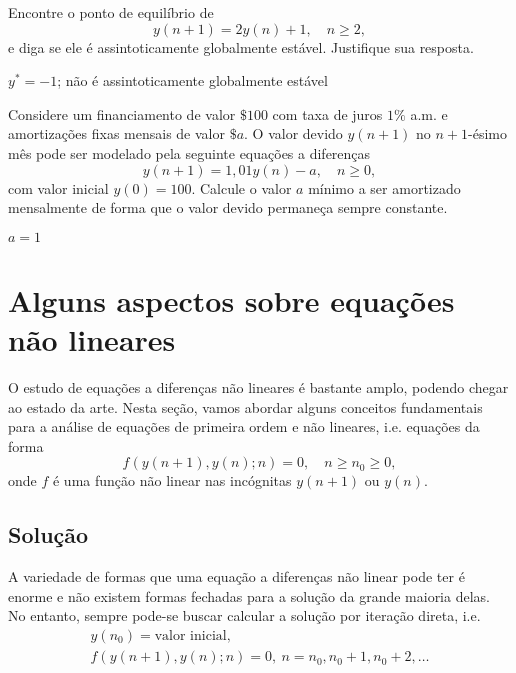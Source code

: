 \begin{exer}
  Encontre o ponto de equilíbrio de
  \begin{equation}
    y(n+1) = 2y(n) + 1,\quad n\geq 2,
  \end{equation}
  e diga se ele é assintoticamente globalmente estável. Justifique sua resposta.
\end{exer}
\begin{resp}
  $y^*=-1$; não é assintoticamente globalmente estável
\end{resp}

\begin{exer}
  Considere um financiamento de valor $\$ 100$ com taxa de juros $1\%$ a.m. e amortizações fixas mensais de valor $\$ a$. O valor devido $y(n+1)$ no $n+1$-ésimo mês pode ser modelado pela seguinte equações a diferenças
  \begin{equation}
    y(n+1) = 1,01y(n)-a,\quad n\geq 0,
  \end{equation}
  com valor inicial $y(0)=100$. Calcule o valor $a$ mínimo a ser amortizado mensalmente de forma que o valor devido permaneça sempre constante.
\end{exer}
\begin{resp}
  $a=1$
\end{resp}

\section{Alguns aspectos sobre equações não lineares}\label{cap_ead1_sec_eqnlin}

O estudo de equações a diferenças não lineares é bastante amplo, podendo chegar ao estado da arte. Nesta seção, vamos abordar alguns conceitos fundamentais para a análise de equações de primeira ordem e não lineares, i.e. equações da forma
\begin{equation}\label{eq:ead1_enl}
  f\left(y(n+1),y(n);n\right)=0,\quad n\geq n_0\geq 0,
\end{equation}
onde $f$ é uma função não linear nas incógnitas $y(n+1)$ ou $y(n)$.

\subsection{Solução}

A variedade de formas que uma equação a diferenças não linear pode ter é enorme e não existem formas fechadas para a solução da grande maioria delas. No entanto, sempre pode-se buscar calcular a solução por iteração direta, i.e.
\begin{gather}
  y(n_0) = \text{valor inicial},\\
  f\left(y(n+1),y(n);n\right)=0, ~ n= n_0, n_0+1, n_0+2, \ldots
\end{gather}

